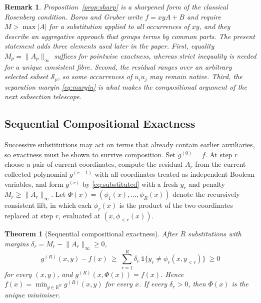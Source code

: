 \documentclass{ieeeaccess}
\newtheorem{theorem}{Theorem}
\newtheorem{remark}{Remark}
\newcommand{\B}{\mathbb{B}}
\newcommand{\norminf}[1]{\lVert #1 \rVert_{\infty}}
\begin{document}
\begin{remark}
Proposition~\ref{prop:sharp} is a sharpened form of the classical Rosenberg condition.
Boros and Gruber \cite{BorosGruber2014} write $f=xyA+B$ and require $M>\max|A|$ for a
substitution applied to all occurrences of $xy$, and they describe an aggregative
approach that groups terms by common parts. The present statement adds three elements
used later in the paper. First, equality $M_p=\norminf{A_p}$ suffices for pointwise
exactness, whereas strict inequality is needed for a unique consistent fibre. Second,
the residual ranges over an arbitrary selected subset $\mathcal{S}_p$, so some
occurrences of $u_iu_j$ may remain native. Third, the separation margin \eqref{eq:margin}
is what makes the compositional argument of the next subsection telescope.
\end{remark}

\subsection{Sequential Compositional Exactness}
\label{sec:reduction:composition}

Successive substitutions may act on terms that already contain earlier auxiliaries, so
exactness must be shown to survive composition. Set $g^{(0)}=f$. At step $r$ choose a pair
of current coordinates, compute the residual $A_r$ from the current collected polynomial
$g^{(r-1)}$ with all coordinates treated as independent Boolean variables, and form
$g^{(r)}$ by \eqref{eq:substituted} with a fresh $y_r$ and penalty $M_r\ge\norminf{A_r}$.
Let $\Phi(x)=(\phi_1(x),\dots,\phi_R(x))$ denote the recursively consistent lift, in which
each $\phi_r(x)$ is the product of the two coordinates replaced at step $r$, evaluated at
$(x,\phi_{<r}(x))$.

\begin{theorem}[Sequential compositional exactness]
\label{thm:composition}
After $R$ substitutions with margins $\delta_r=M_r-\norminf{A_r}\ge 0$,
\begin{equation}
g^{(R)}(x,y)-f(x)\ \ge\ \sum_{r=1}^{R}\delta_r\,\mathbb{1}\{y_r\neq\phi_r(x,y_{<r})\}\ \ge 0
\label{eq:telescope}
\end{equation}
for every $(x,y)$, and $g^{(R)}(x,\Phi(x))=f(x)$. Hence
$f(x)=\min_{y\in\B^R}g^{(R)}(x,y)$ for every $x$. If every $\delta_r>0$, then
$\Phi(x)$ is the unique minimiser.
\end{theorem}
\end{document}
